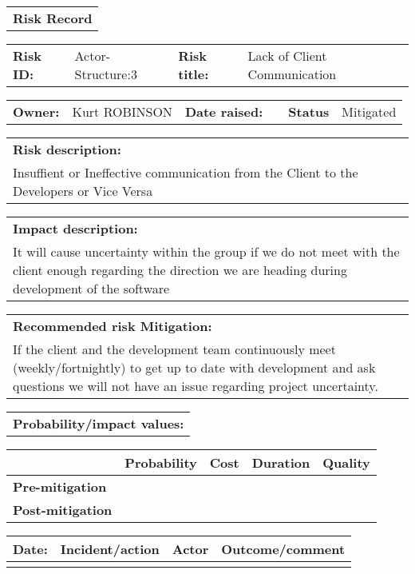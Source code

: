 \begin{table}
	\begin{tabularx}{\textwidth}{| X |}
		\hline
		\textbf{Risk Record} \\
	\end{tabularx}
	\begin{tabularx}{\textwidth}{| l | X | l | X |}
		\hline
		\textbf{Risk ID:} & Actor-Structure:3 & \textbf{Risk title:} & Lack of Client Communication  \\
	\end{tabularx}
	\begin{tabularx}{\textwidth}{| l | X | l | X | l | X |}
		\hline
		\textbf{Owner:} & Kurt ROBINSON & \textbf{Date raised:} &  & \textbf{Status} & Mitigated \\
	\end{tabularx}
	\begin{tabularx}{\textwidth}{| X |}
		\hline
		\textbf{Risk description:} \\ Insuffient or Ineffective communication from the Client to the Developers or Vice Versa \\
	\end{tabularx}
	\begin{tabularx}{\textwidth}{| X |}
		\hline
		\textbf{Impact description:} \\ It will cause uncertainty within the group if we do not meet with the client enough regarding the direction we are heading during development of the software \\
	\end{tabularx}
	\begin{tabularx}{\textwidth}{| X |}
		\hline
		\textbf{Recommended risk Mitigation:} \\ If the client and the development team continuously meet (weekly/fortnightly) to get up to date with development and ask questions we will not have an issue regarding project uncertainty. \\
	\end{tabularx}
	\begin{tabularx}{\textwidth}{| X |}
		\hline
		\textbf{Probability/impact values:} \\
	\end{tabularx}
	\begin{tabularx}{\textwidth}{| l | l | X | X | X |}
		\hline
		 &  \textbf{Probability} & \textbf{Cost} & \textbf{Duration} & \textbf{Quality} \\ \hline
		\textbf{Pre-mitigation} & & & & \\ \hline
		\textbf{Post-mitigation} & & & & \\ \hline \hline
	\end{tabularx}
	\begin{tabularx}{\textwidth}{| l | X | l | X |}
		\hline
		\textbf{Date:} & \textbf{Incident/action} & \textbf{Actor} & \textbf{Outcome/comment} \\ \hline
		 & &  &  \\ \hline
	\end{tabularx}
\end{table}

